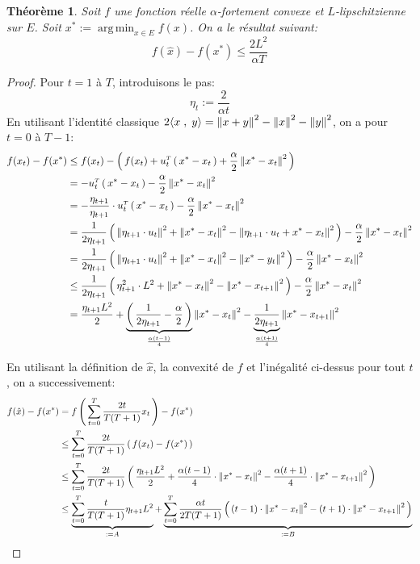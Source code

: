 \documentclass[11pt]{article}
\DeclareMathOperator*{\argmin}{arg\,min} %
\newcommand{\transpose}[1]{\ensuremath{#1^{\scriptscriptstyle T}}}
\newcommand{\dotpourvariable}{\:\cdot\:}
\newcommand{\ifempty}[3]{\ifx\hfuzz#1\hfuzz #2 \else #3\fi}
\newcommand{\norme}[1]{\left\lVert\ifempty{#1}{\dotpourvariable}{#1}\right\rVert}
\newcommand{\prt}[1]{\left( \, #1  \, \right)}
\newcommand{\ps}[2]{ \langle #1 \;,\; #2  \rangle}
\newtheorem{theorem}{Théorème}[section]
\begin{document}
\begin{theorem}

Soit $f$ une fonction réelle $\alpha$-fortement convexe et $L$-lipschitzienne sur
$E$. Soit $x^{*}:= \argmin_{x\in E} f(x)$. On a le résultat suivant:
\begin{equation}
f(\hat{x})-f(x^{*}) \leq \frac{2 L^2}{\alpha T}
\end{equation}
\end{theorem}

\begin{proof}
Pour $t=1$ à $T$, introduisons le pas:
\begin{equation}
  \eta_t := \frac{2}{\alpha t}
\end{equation}
En utilisant l'identité classique $2\ps{x}{y} = \norme{x+y}^2-\norme{x}^2-\norme{y}^2$, on a pour $t=0$ à $T-1$:
\begin{align*}
f(x_t)-f(x^{*}) &\leq f(x_t)-\prt{f(x_t) + \transpose{u_t}\prt{x^{*}-x_t}
+ \frac{\alpha}{2} \norme{x^{*}-x_t}^2}\\
&= -\transpose{u_t}\prt{x^{*}-x_t}
- \frac{\alpha}{2} \norme{x^{*}-x_t}^2\\
&= -\frac{\eta_{t+1}}{\eta_{t+1}} \cdot \transpose{u_t}\prt{x^{*}-x_t}
- \frac{\alpha}{2} \norme{x^{*}-x_t}^2\\
&= \frac{1}{2 \eta_{t+1} }\prt{\norme{\eta_{t+1} \cdot u_t}^2+\norme{x^{*}-x_t}^2-\norme{\eta_{t+1} \cdot u_t+x^{*}-x_t}^2
}- \frac{\alpha}{2} \norme{x^{*}-x_t}^2\\
&= \frac{1}{2 \eta_{t+1} }\prt{\norme{\eta_{t+1} \cdot u_t}^2+\norme{x^{*}-x_t}^2-\norme{ x^{*}-y_t}^2
}- \frac{\alpha}{2} \norme{x^{*}-x_t}^2\\
&\leq  \frac{1}{2 \eta_{t+1} }\prt{\eta_{t+1}^2\cdot L^2+\norme{x^{*}-x_t}^2-\norme{x^{*}-x_{t+1}}^2
}- \frac{\alpha}{2} \norme{x^{*}-x_t}^2\\
&= \frac{\eta_{t+1} L^2}{2} + \underbrace{\prt{\frac{1}{2 \eta_{t+1} } - \frac{\alpha}{2}}}_{\frac{\alpha (t-1)}{4}} \norme{x^{*}-x_t}^2
- \underbrace{\frac{1}{2 \eta_{t+1} }}_{\frac{\alpha (t+1)}{4}} \norme{x^{*}-x_{t+1}}^2
\end{align*}

En utilisant la définition de $\hat{x}$, la convexité de $f$ et l'inégalité ci-dessus pour tout $t$, on a successivement:
\begin{align*}
  f(\hat{x})-f(x^{*}) &= f\prt{\sum_{t=0}^T \frac{2t}{T(T+1)} x_t}-f(x^{*})\\
  &\leq  \sum_{t=0}^T \frac{2t}{T(T+1)} \prt{f(x_t)-f(x^{*})}\\
  &\leq  \sum_{t=0}^T \frac{2t}{T(T+1)} \prt{\frac{\eta_{t+1} L^2}{2}+\frac{\alpha (t-1)}{4} \cdot \norme{x^{*}-x_t}^2-\frac{\alpha (t+1)}{4} \cdot  \norme{x^{*}-x_{t+1}}^2}\\
  &\leq  \underbrace{\sum_{t=0}^T \frac{t}{T(T+1)} \eta_{t+1} L^2}_{:=A}+\underbrace{\sum_{t=0}^T \frac{\alpha t}{2T(T+1)}  \prt{(t-1) \cdot \norme{x^{*}-x_t}^2-(t+1) \cdot  \norme{x^{*}-x_{t+1}}^2}}_{:=B}\\
\end{align*}


\end{proof}
\end{document}
